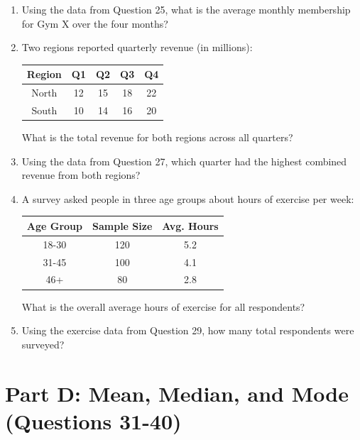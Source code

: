 \documentclass[12pt,a4paper]{article}
\begin{document}
\begin{enumerate}
\item Using the data from Question 25, what is the average monthly membership for Gym X over the four months?

\item Two regions reported quarterly revenue (in millions):
\begin{center}
\begin{tabular}{|c|c|c|c|c|}
\hline
Region & Q1 & Q2 & Q3 & Q4 \\
\hline
North & 12 & 15 & 18 & 22 \\
South & 10 & 14 & 16 & 20 \\
\hline
\end{tabular}
\end{center}
What is the total revenue for both regions across all quarters?

\item Using the data from Question 27, which quarter had the highest combined revenue from both regions?

\item A survey asked people in three age groups about hours of exercise per week:
\begin{center}
\begin{tabular}{|c|c|c|}
\hline
Age Group & Sample Size & Avg. Hours \\
\hline
18-30 & 120 & 5.2 \\
31-45 & 100 & 4.1 \\
46+ & 80 & 2.8 \\
\hline
\end{tabular}
\end{center}
What is the overall average hours of exercise for all respondents?

\item Using the exercise data from Question 29, how many total respondents were surveyed?

\end{enumerate}

\section{Part D: Mean, Median, and Mode (Questions 31-40)}
\end{document}
